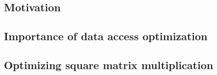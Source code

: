 \subsection{Motivation}


\subsection{Importance of data access optimization}


\subsection{Optimizing square matrix multiplication}



